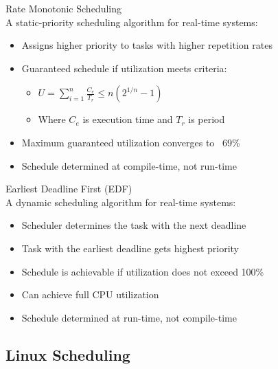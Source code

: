 \begin{definition}{Rate Monotonic Scheduling}\\
    A static-priority scheduling algorithm for real-time systems:
    \begin{itemize}
        \item Assigns higher priority to tasks with higher repetition rates
        \item Guaranteed schedule if utilization meets criteria:
            \begin{itemize}
                \item $U = \sum_{i=1}^{n} \frac{C_e}{T_r} \leq n(2^{1/n} - 1)$
                \item Where $C_e$ is execution time and $T_r$ is period
            \end{itemize}
        \item Maximum guaranteed utilization converges to ~69\%
        \item Schedule determined at compile-time, not run-time
    \end{itemize}
\end{definition}

\begin{definition}{Earliest Deadline First (EDF)}\\
    A dynamic scheduling algorithm for real-time systems:
    \begin{itemize}
        \item Scheduler determines the task with the next deadline
        \item Task with the earliest deadline gets highest priority
        \item Schedule is achievable if utilization does not exceed 100\%
        \item Can achieve full CPU utilization
        \item Schedule determined at run-time, not compile-time
    \end{itemize}
\end{definition}

\subsection{Linux Scheduling}

